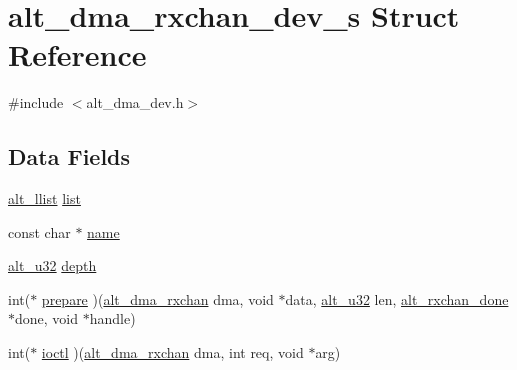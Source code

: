 \hypertarget{structalt__dma__rxchan__dev__s}{\section{alt\-\_\-dma\-\_\-rxchan\-\_\-dev\-\_\-s \-Struct \-Reference}
\label{structalt__dma__rxchan__dev__s}
}


{\ttfamily \#include $<$alt\-\_\-dma\-\_\-dev.\-h$>$}

\subsection*{\-Data \-Fields}
\begin{DoxyCompactItemize}
\item 
\hyperlink{alt__llist_8h_a94b50b44e6bd512a432af0b840d49aa4}{alt\-\_\-llist} \hyperlink{structalt__dma__rxchan__dev__s_a3f58d046b28735c0e628aa1de56acd9b}{list}
\item 
const char $\ast$ \hyperlink{structalt__dma__rxchan__dev__s_a8f8f80d37794cde9472343e4487ba3eb}{name}
\item 
\hyperlink{alt__types_8h_acd6a6a2004f05f01beaa42367510d8af}{alt\-\_\-u32} \hyperlink{structalt__dma__rxchan__dev__s_afd8dffe5373527164cd8341e4c1d479d}{depth}
\item 
int($\ast$ \hyperlink{structalt__dma__rxchan__dev__s_af9a5563e6c9cf1e1d2f37c0db9fe4130}{prepare} )(\hyperlink{alt__dma__dev_8h_af6d5713369babdeab85deb8c88191669}{alt\-\_\-dma\-\_\-rxchan} dma, void $\ast$data, \hyperlink{alt__types_8h_acd6a6a2004f05f01beaa42367510d8af}{alt\-\_\-u32} len, \hyperlink{alt__dma__dev_8h_a61694bb78e4edebc1d99b09d2bf81449}{alt\-\_\-rxchan\-\_\-done} $\ast$done, void $\ast$handle)
\item 
int($\ast$ \hyperlink{structalt__dma__rxchan__dev__s_afd98a37c84f8d21e5f870c44e0a84cfb}{ioctl} )(\hyperlink{alt__dma__dev_8h_af6d5713369babdeab85deb8c88191669}{alt\-\_\-dma\-\_\-rxchan} dma, int req, void $\ast$arg)
\end{DoxyCompactItemize}


